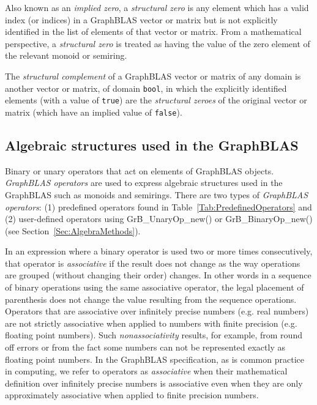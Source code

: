  Also known as an \emph{implied zero}, a \emph{structural zero} is 
any element which has a valid index (or indices) in a GraphBLAS vector or matrix 
but is not explicitly identified in the list of elements of that vector or matrix. From 
a mathematical perspective, a \emph{structural zero} is treated as having the 
value of the zero element of the relevant monoid or semiring.

 The \emph{structural complement} of a 
GraphBLAS vector or matrix of any domain is another vector or matrix, 
of domain {\tt bool}, in which the explicitly identified elements (with a value of {\tt true}) 
are the \emph{structural zeroes} of the original vector or matrix 
(which have an implied value of {\tt false}). 
\glossEnd



\subsection{Algebraic structures used in the GraphBLAS}

\glossBegin
{} Binary or unary operators that act on elements of GraphBLAS 
objects.  \emph{GraphBLAS operators} are used to express algebraic structures used in the 
GraphBLAS such as monoids and semirings. There are two 
types of \emph{GraphBLAS operators}: (1) predefined operators found in Table~\ref{Tab:PredefinedOperators} 
and (2) user-defined operators using {\sf GrB\_UnaryOp\_new()} or {\sf GrB\_BinaryOp\_new()} (see Section~\ref{Sec:AlgebraMethods}).

 In an expression where a binary operator is used two or more times consecutively, that operator is 
\emph{associative} if the result does not change as the way operations are grouped (without changing their order) changes. In other
words in a sequence of binary operations using the same associative operator, the legal placement of parenthesis does not change the 
value resulting from the sequence operations.  Operators that are associative over infinitely precise numbers (e.g. real numbers) are not 
strictly associative when applied to numbers with finite precision (e.g. floating point numbers). Such \emph{nonassociativity} results, for example, from 
round off errors or from the fact some numbers can not be represented exactly as floating point numbers.   In the GraphBLAS specification, 
as is common practice in computing, we refer to operators as \emph{associative} when their mathematical 
definition over infinitely precise numbers is associative even when they are only approximately associative when applied
to finite precision numbers.


